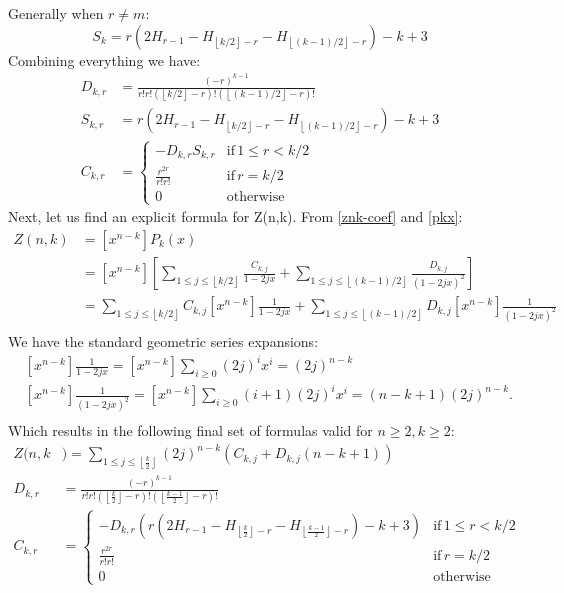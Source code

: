 \documentclass{article}
\newcommand{\floor}[1]{\left\lfloor #1 \right\rfloor}
\begin{document}
Generally when $r \neq m$:
\begin{equation}\label{s-k}
    S_k = r(2H_{r-1}-H_{\floor{k/2}-r}-H_{\floor{(k-1)/2}-r})-k+3
\end{equation}
Combining everything we have:
\begin{equation}\label{d-s-c}
    \begin{aligned}
        D_{k,r} &= \frac{(-r)^{k-1}}{r!r!(\floor{k/2}-r)!(\floor{(k-1)/2}-r)!} \\
        S_{k,r} &= r(2H_{r-1}-H_{\floor{k/2}-r}-H_{\floor{(k-1)/2}-r})-k+3 \\
        C_{k,r} &= 
        \begin{cases}
            - D_{k,r} S_{k,r} & \text{if}\, 1 \leq r < k/2\\
            \frac{r^{2r}}{r!r!} & \text{if}\, r = k/2\\
            0 & \text{otherwise}
        \end{cases} 
    \end{aligned}
\end{equation}
Next, let us find an explicit formula for Z(n,k). From \ref{znk-coef} and \ref{pkx}:
$$
\begin{aligned}
    Z(n,k) &=[x^{n-k}]P_k(x) \\
    &= [x^{n-k}]\left[ \sum_{1 \leq j \leq \floor{k/2}} \frac{C_{k,j}}{1-2jx} + \sum_{1 \leq j \leq \floor{(k-1)/2}} \frac{D_{k,j}}{(1-2jx)^2} \right]\\
     &= \sum_{1 \leq j \leq \floor{k/2}}C_{k,j}[x^{n-k}]  \frac{1}{1-2jx} + \sum_{1 \leq j \leq \floor{(k-1)/2}} D_{k,j}[x^{n-k}]\frac{1}{(1-2jx)^2} \\ 
\end{aligned}
$$
We have the standard geometric series expansions:
$$
\begin{aligned}
     & [x^{n-k}]\frac{1}{1-2jx} = [x^{n-k}]\sum_{i\geq0}(2j)^ix^i = (2j)^{n-k}\\ 
     & [x^{n-k}]\frac{1}{(1-2jx)^2} = [x^{n-k}]\sum_{i\geq0}(i+1)(2j)^ix^i = (n-k+1)(2j)^{n-k}.\\ 
\end{aligned}
$$
Which results in the following final set of formulas valid for $n \geq 2, k \geq 2$:
\begin{equation}\label{z-d-c}
    \begin{aligned}
        Z(n,k &)= \sum_{1 \leq j \leq \floor{\frac{k}{2}}}(2j)^{n-k}\left (C_{k,j} +D_{k,j}(n-k+1) \right )\\
            D_{k,r} &= \frac{(-r)^{k-1}}{r!r!(\floor{\frac{k}{2}}-r)!(\floor{\frac{k-1}{2}}-r)!} \\
            C_{k,r} &= \begin{cases}
                - D_{k,r} (r(2H_{r-1}-H_{\floor{\frac{k}{2}}-r}-H_{\floor{\frac{k-1}{2}}-r})-k+3) & \text{if} \, 1 \leq r < k/2\\
                \frac{r^{2r}}{r!r!} & \text{if}  \, r = k/2\\
                0 & \text{otherwise}
            \end{cases} 
    \end{aligned}
\end{equation}
\end{document}
